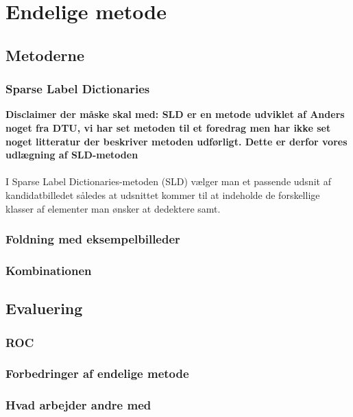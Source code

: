 \section{Endelige metode}
\subsection{Metoderne}
\subsubsection{Sparse Label Dictionaries}	%
\textbf{Disclaimer der måske skal med: SLD er en metode udviklet af Anders noget fra DTU, vi har set metoden til et foredrag men har ikke set noget litteratur der beskriver metoden udførligt. Dette er derfor vores udlægning af SLD-metoden}\\
\\
I Sparse Label Dictionaries-metoden (SLD) vælger man et passende udsnit af kandidatbilledet således at udsnittet kommer til at indeholde de forskellige klasser af elementer man ønsker at dedektere samt.

\subsubsection{Foldning med eksempelbilleder} %
\subsubsection{Kombinationen} %
\subsection{Evaluering}
\subsubsection{ROC}

\subsubsection{Forbedringer af endelige metode}
\subsubsection{Hvad arbejder andre med} %
